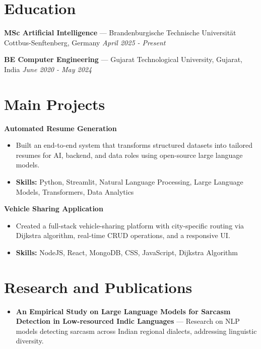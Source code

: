 \documentclass[a4paper,10pt]{article}
\begin{document}
\section*{Education}
\textbf{MSc Artificial Intelligence} — Brandenburgische Technische Universität Cottbus-Senftenberg, Germany \hfill \textit{April 2025 - Present}\par
\vspace{1.5pt}
\textbf{BE Computer Engineering} — Gujarat Technological University, Gujarat, India \hfill \textit{June 2020 - May 2024}\par

\section*{Main Projects}
\textbf{Automated Resume Generation}\par
\vspace{1pt}
\begin{itemize}
  \item Built an end-to-end system that transforms structured datasets into tailored resumes for AI, backend, and data roles using open-source large language models.
  \item \textbf{Skills:} Python, Streamlit, Natural Language Processing, Large Language Models, Transformers, Data Analytics
\end{itemize}
\vspace{3pt}
\textbf{Vehicle Sharing Application}\par
\vspace{1pt}
\begin{itemize}
  \item Created a full-stack vehicle-sharing platform with city-specific routing via Dijkstra algorithm, real-time CRUD operations, and a responsive UI.
  \item \textbf{Skills:} NodeJS, React, MongoDB, CSS, JavaScript, Dijkstra Algorithm
\end{itemize}

\section*{Research and Publications}
\begin{itemize}
\item \textbf{An Empirical Study on Large Language Models for Sarcasm Detection in Low-resourced Indic Languages} — Research on NLP models detecting sarcasm across Indian regional dialects, addressing linguistic diversity.
\end{itemize}
\end{document}
